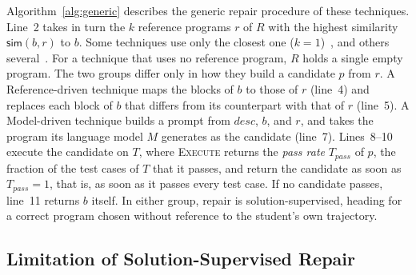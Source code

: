 \documentclass[conference]{IEEEtran}
\begin{document}
Algorithm~\ref{alg:generic} describes the generic repair procedure of these techniques. Line~2 takes in turn the \(k\) reference programs \(r\) of \(R\) with the highest similarity \(\mathsf{sim}(b,r)\) to \(b\). Some techniques use only the closest one (\(k=1\))~\cite{hu2019re,zhao2026peer}, and others several~\cite{wang2018search,dai2026learner}. For a technique that uses no reference program, \(R\) holds a single empty program. The two groups differ only in how they build a candidate \(p\) from \(r\). A Reference-driven technique maps the blocks of \(b\) to those of \(r\) (line~4) and replaces each block of \(b\) that differs from its counterpart with that of \(r\) (line~5). A Model-driven technique builds a prompt from \(\mathit{desc}\), \(b\), and \(r\), and takes the program its language model \(M\) generates as the candidate (line~7). Lines~8--10 execute the candidate on \(T\), where \textsc{Execute} returns the \emph{pass rate} \(T_{\mathit{pass}}\) of \(p\), the fraction of the test cases of \(T\) that it passes, and return the candidate as soon as \(T_{\mathit{pass}}=1\), that is, as soon as it passes every test case. If no candidate passes, line~11 returns \(b\) itself. In either group, repair is solution-supervised, heading for a correct program chosen without reference to the student's own trajectory.

\subsection{Limitation of Solution-Supervised Repair}
\label{sec:limitation}
\end{document}
